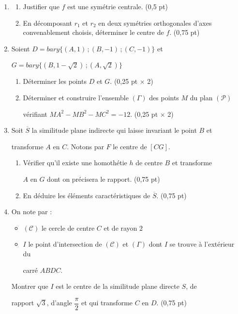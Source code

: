 \begin{enumerate}
	\item
	\begin{enumerate}
		\item Justifier que $f$ est une symétrie centrale. \hfill (0,5 pt)
		\item En décomposant $r_1$ et $r_2$ en deux symétries orthogonales d'axes convenablement choisis, déterminer le centre de $f$. \hfill (0,75 pt)
	\end{enumerate}
	\item Soient $D = bary\{(A,1)\,;(B,-1)\,;(C,-1)\}$ et

	$G = bary\{(B,1-\sqrt{2})\,;(A,\sqrt{2})\}$

	\begin{enumerate}
		\item Déterminer les points $D$ et $G$. \hfill (0,25 pt $\times$ 2)
		\item Déterminer et construire l'ensemble $(\Gamma)$ des points $M$ du plan $(\mathscr{P})$

		vérifiant $MA^2 - MB^2 - MC^2 = -12$. \hfill (0,25 pt $\times$ 2)
	\end{enumerate}
	\item Soit $\overline{S}$ la similitude plane indirecte qui laisse invariant le point $B$ et

	transforme $A$ en $C$. Notons par $F$ le centre de $[CG]$.
	\begin{enumerate}
		\item Vérifier qu'il existe une homothétie $h$ de centre $B$ et transforme

		$A$ en $G$ dont on précisera le rapport. \hfill (0,75 pt)
		\item En déduire les éléments caractéristiques de $\overline{S}$. \hfill (0,75 pt)
	\end{enumerate}
	\item On note par :
	\begin{itemize}[label=--]
		\item $(\mathscr{C})$ le cercle de centre $C$ et de rayon $2$
		\item $I$ le point d'intersection de $(\mathscr{C})$ et $(\Gamma)$ dont $I$ se trouve à l'extérieur du

		carré $ABDC$.
	\end{itemize}
	Montrer que $I$ est le centre de la similitude plane directe $S$, de

	rapport $\sqrt{3}$, d'angle $\dfrac{\pi}{2}$ et qui transforme $C$ en $D$. \hfill (0,75 pt)
\end{enumerate}

